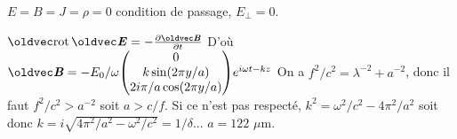 \begin{solution}

\begin{questions}
    \questioncours $E=B=J=\rho=0$ condition de passage, $E_\perp = 0$.
    \question 
    \question $\rot\vE = -\pdv{\vB}{t}$ D'où $ \vB = -E_0/\omega \mqty(0 \\ k \sin(2\pi y/a) \\ 2i\pi/a\cos(2\pi y/a))e^{i\omega t -kz}$
    \question On a $f^2/c^2 = \lambda^{-2} + a^{-2}$, donc il faut $f^2/c^2 > a^{-2}$ soit $a > c/f$.
    \question Si ce n'est pas respecté, $k^2 = \omega^2/c^2 - 4\pi^2/a^2$ soit donc $k = i\sqrt{4\pi^2/a^2 - \omega^2/c^2} = 1/\delta$...
    \question $a = 122$ $\mu$m.
\end{questions}

\end{solution}
